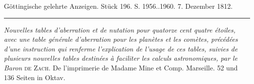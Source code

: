 \clearpage
{}
\hypertarget{native-551-lower}{}\label{native-551-lower}
\begin{center}\small Göttingische gelehrte Anzeigen. Stück 196. S. 1956..1960. 7. Dezember 1812.\\[3pt]\rule{.72\linewidth}{.3pt}\end{center}

\emph{Nouvelles tables d'aberration et de nutation pour quatorze cent quatre étoiles, avec une table générale d'aberration pour les planètes et les comètes, précédées d'une instruction qui renferme l'explication de l'usage de ces tables, suivies de plusieurs nouvelles tables destinées à faciliter les calculs astronomiques, par le Baron} \textsc{de Zach}. De l'imprimerie de Madame Mine et Comp. Marseille. 52 und 136 Seiten in Oktav.

